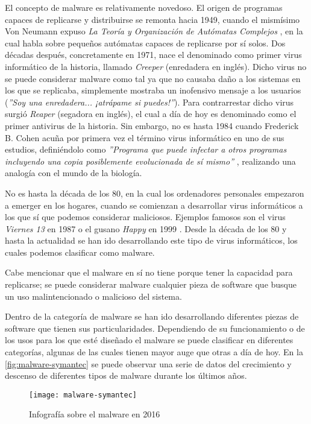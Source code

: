 El concepto de malware es relativamente novedoso. El origen de programas capaces de replicarse y distribuirse se remonta hacia 1949, cuando el mismísimo Von Neumann expuso \emph{La Teoría y Organización de Autómatas Complejos} \cite{von-neumann}, en la cual habla sobre pequeños autómatas capaces de replicarse por sí solos. Dos décadas después, concretamente en 1971, nace el denominado como primer virus informático de la historia, llamado \emph{Creeper} \cite{creeper} (enredadera en inglés).  Dicho virus no se puede considerar malware como tal ya que no causaba daño a los sistemas en los que se replicaba, simplemente mostraba un inofensivo mensaje a los usuarios (\textsl{''Soy una enredadera... ¡atrápame si puedes!''}). Para contrarrestar dicho virus surgió \emph{Reaper} (segadora en inglés), el cual a día de hoy es denominado como el primer antivirus de la historia. Sin embargo, no es hasta 1984 cuando Frederick B. Cohen acuña por primera vez el término virus informático en uno de sus estudios, definiéndolo como \emph{''Programa que puede infectar a otros programas incluyendo una copia posiblemente evolucionada de sí mismo''} \cite{panda-virus-history}, realizando una analogía con el mundo de la biología.

No es hasta la década de los 80, en la cual los ordenadores personales empezaron a emerger en los hogares, cuando se comienzan a desarrollar virus informáticos a los que sí que podemos considerar maliciosos. Ejemplos famosos son el virus \emph{Viernes 13} en 1987 o el gusano \emph{Happy} en 1999 \cite{panda-virus-history}. Desde la década de los 80 y hasta la actualidad se han ido desarrollando este tipo de virus informáticos, los cuales podemos clasificar como malware.

Cabe mencionar que el malware en sí no tiene porque tener la capacidad para replicarse; se puede considerar malware cualquier pieza de software que busque un uso malintencionado o malicioso del sistema.

Dentro de la categoría de malware se han ido desarrollando diferentes piezas de software que tienen sus particularidades. Dependiendo de su funcionamiento o de los usos para los que esté diseñado el malware se puede clasificar en diferentes categorías, algunas de las cuales tienen mayor auge que otras a día de hoy. En la \autoref{fig:malware-symantec} se puede observar una serie de datos del crecimiento y descenso de diferentes tipos de malware durante los últimos años.

\begin{figure}[H]
	\centering
	\texttt{[image: malware-symantec]}
	\caption{Infografía sobre el malware en 2016 \cite{malware-symantec}}
	\label{fig:malware-symantec}
\end{figure}

